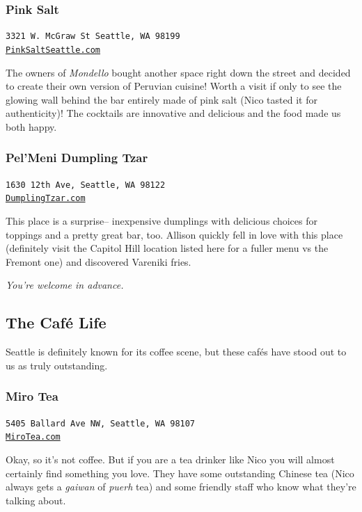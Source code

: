\documentclass[12pt]{article}
\begin{document}
\subsubsection{Pink Salt}
\begin{center}
    \texttt{3321 W. McGraw St Seattle, WA 98199\\\href{https://pinksaltseattle.com/}{PinkSaltSeattle.com}}
\end{center}
The owners of \textit{Mondello} bought another space right down the street and decided to create 
their own version of Peruvian cuisine! Worth a visit if only to see the glowing wall behind the bar
entirely made of pink salt (Nico tasted it for authenticity)! The cocktails are innovative and delicious 
and the food made us both happy.

\subsubsection{Pel'Meni Dumpling Tzar}
\begin{center}
    \texttt{1630 12th Ave, Seattle, WA 98122\\\href{http://dumplingtzar.com/}{DumplingTzar.com}}
\end{center}
This place is a surprise-- inexpensive dumplings with delicious choices for toppings and a pretty 
great bar, too. Allison quickly fell in love with this place (definitely visit the Capitol Hill location 
listed here for a fuller menu vs the Fremont one) and discovered Vareniki fries. 
\begin{center}
    \textit{You're welcome in advance.}    
\end{center}
\hrulefill

\subsection{The Caf\'e Life}
\label{subsec-cafe}
Seattle is definitely known for its coffee scene, but these caf\'es have stood out to us as truly outstanding.
\subsubsection{Miro Tea}
\begin{center}
    \texttt{5405 Ballard Ave NW, Seattle, WA 98107\\\href{http://mirotea.com/}{MiroTea.com}}
\end{center}

Okay, so it's not coffee. But if you are a tea drinker like Nico you will almost certainly
find something you love. They have some outstanding Chinese tea (Nico always gets a \textit{gaiwan} of \textit{puerh} tea)
and some friendly staff who know what they're talking about.
\end{document}

